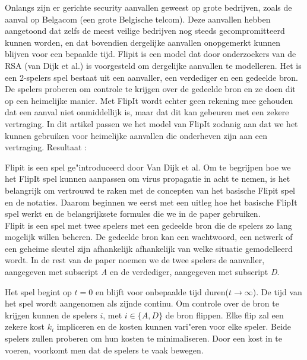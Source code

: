 \documentclass[master=cws, masteroption=vs]{kulemt}
\begin{document}
\begin{abstract*}
Onlangs zijn er gerichte security aanvallen geweest op grote bedrijven, zoals de aanval op Belgacom (een grote Belgische telcom). Deze aanvallen hebben aangetoond dat zelfs de meest veilige
bedrijven nog steeds gecompromitteerd kunnen worden, en dat bovendien dergelijke aanvallen onopgemerkt kunnen blijven voor een bepaalde tijd.
Flipit is een model dat door onderzoekers van de RSA (van Dijk et al.) is voorgesteld om dergelijke aanvallen te modelleren. Het is een 2-spelers spel bestaat uit een aanvaller, een verdediger en een gedeelde bron.  De spelers proberen om controle te krijgen over de gedeelde bron en ze
doen dit op een heimelijke manier. Met FlipIt wordt echter geen rekening mee gehouden dat een aanval niet onmiddellijk is, maar dat dit kan gebeuren met een zekere vertraging. In dit artikel passen we het model van FlipIt zodanig aan dat we het kunnen gebruiken voor heimelijke aanvallen die onderheven zijn aan een vertraging.
Resultaat :

Flipit is een spel ge"introduceerd door Van Dijk et al. Om te begrijpen hoe we het FlipIt spel kunnen aanpassen om virus propagatie in acht te nemen, is het belangrijk om vertrouwd te raken met de concepten van het basische Flipit spel en de notaties. Daarom beginnen we eerst met een uitleg hoe het basische FlipIt spel werkt en de belangrijksete formules die we in de paper gebruiken. \\

Flipit is een spel met twee spelers met een gedeelde bron die de spelers zo lang mogelijk willen beheren. De gedeelde bron kan een wachtwoord, een netwerk of een geheime sleutel zijn afhankelijk afhankelijk van welke situatie gemodelleerd wordt. In de rest van de paper noemen we de twee spelers de aanvaller, aangegeven met subscript \textit{A} en de verdediger, aangegeven met subscript \textit{D}.

Het spel begint op $ t = 0 $ en blijft voor onbepaalde tijd duren($ t \rightarrow \infty $). De tijd van het spel wordt aangenomen als zijnde continu. Om controle over de bron te krijgen kunnen de spelers $i$, met $ i \in \{A, D \} $ de bron flippen. Elke flip zal een zekere kost $ k_{i} $ impliceren en de kosten kunnen vari"eren voor elke speler. Beide spelers zullen proberen om hun kosten te minimaliseren. Door een kost in te voeren, voorkomt men dat de spelers te vaak bewegen. \\


\end{abstract*}
\end{document}
